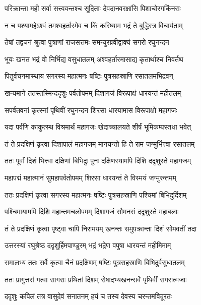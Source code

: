 \twolineshloka
{परिक्रान्ता मही सर्वा सत्त्ववन्तश्च सूदिताः}
{देवदानवरक्षांसि पिशाचोरगकिंनराः} %

\twolineshloka
{न च पश्यामहेऽश्वं तमश्वहर्तारमेव च}
{किं करिष्याम भद्रं ते बुद्धिरत्र विचार्यताम्} %

\twolineshloka
{तेषां तद्वचनं श्रुत्वा पुत्राणां राजसत्तमः}
{समन्युरब्रवीद्वाक्यं सगरो रघुनन्दन} %

\twolineshloka
{भूयः खनत भद्रं वो निर्भिद्य वसुधातलम्}
{अश्वहर्तारमासाद्य कृतार्थाश्च निवर्तथ} %

\twolineshloka
{पितुर्वचनमास्थाय सगरस्य महात्मनः}
{षष्टिः पुत्रसहस्राणि रसातलमभिद्रवन्} %

\twolineshloka
{खन्यमाने ततस्तस्मिन्ददृशुः पर्वतोपमम्}
{दिशागजं विरूपाक्षं धारयन्तं महीतलम्} %

\twolineshloka
{सपर्वतवनां कृत्स्नां पृथिवीं रघुनन्दन}
{शिरसा धारयामास विरूपाक्षो महागजः} %

\twolineshloka
{यदा पर्वणि काकुत्स्थ विश्रमार्थं महागजः}
{खेदाच्चालयते शीर्षं भूमिकम्पस्तधा भवेत्} %

\twolineshloka
{तं ते प्रदक्षिणं कृत्वा दिशापालं महागजम्}
{मानयन्तो हि ते राम जग्मुर्भित्त्वा रसातलम्} %

\twolineshloka
{ततः पूर्वां दिशं भित्त्वा दक्षिणां बिभिदुः पुनः}
{दक्षिणस्यामपि दिशि ददृशुस्ते महागजम्} %

\twolineshloka
{महापद्मं महात्मानं सुमहापर्वतोपमम्}
{शिरसा धारयन्तं ते विस्मयं जग्मुरुत्तमम्} %

\twolineshloka
{ततः प्रदक्षिणं कृत्वा सगरस्य महात्मनः}
{षष्टिः पुत्रसहस्राणि पश्चिमां बिभिदुर्दिशम्} %

\twolineshloka
{पश्चिमायामपि दिशि महान्तमचलोपमम्}
{दिशागजं सौमनसं ददृशुस्ते महाबलाः} %

\twolineshloka
{तं ते प्रदक्षिणं कृत्वा पृष्ट्वा चापि निरामयम्}
{खनन्तः समुपक्रान्ता दिशं सोमवतीं तदा} %

\twolineshloka
{उत्तरस्यां रघुश्रेष्ठ ददृशुर्हिमपाण्डुरम्}
{भद्रं भद्रेण वपुषा धारयन्तं महीमिमाम्} %

\twolineshloka
{समालभ्य ततः सर्वे कृत्वा चैनं प्रदक्षिणम्}
{षष्टिः पुत्रसहस्राणि बिभिदुर्वसुधातलम्} %

\twolineshloka
{ततः प्रागुत्तरां गत्वा सागराः प्रथितां दिशम्}
{रोषादभ्यखनन्सर्वे पृथिवीं सगरात्मजाः} %

\twolineshloka
{ददृशुः कपिलं तत्र वासुदेवं सनातनम्}
{हयं च तस्य देवस्य चरन्तमविदूरतः} %

